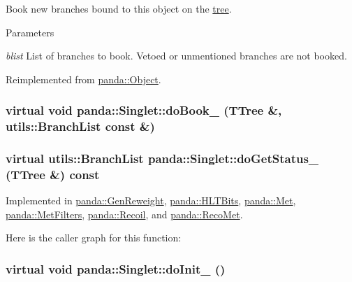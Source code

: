 Book new branches bound to this object on the \hyperlink{namespacepanda_1_1tree}{tree}. 
\begin{DoxyParams}{Parameters}
\item[{\em blist}]List of branches to book. Vetoed or unmentioned branches are not booked. \end{DoxyParams}


Reimplemented from \hyperlink{classpanda_1_1Object_a2fcd6665633deef16e86aa4e49135dd7}{panda::Object}.\hypertarget{classpanda_1_1Singlet_ab72b7d0fc56f6c5cfe4b8200c8927b1b}{
\subsubsection[{doBook\_\-}]{\setlength{\rightskip}{0pt plus 5cm}virtual void panda::Singlet::doBook\_\- (TTree \&, \/  {\bf utils::BranchList} const \&)}}
\label{classpanda_1_1Singlet_ab72b7d0fc56f6c5cfe4b8200c8927b1b}
\hypertarget{classpanda_1_1Singlet_ad2749c2f28a2970eda99db906a116881}{
\subsubsection[{doGetStatus\_\-}]{\setlength{\rightskip}{0pt plus 5cm}virtual {\bf utils::BranchList} panda::Singlet::doGetStatus\_\- (TTree \&) const}}
\label{classpanda_1_1Singlet_ad2749c2f28a2970eda99db906a116881}


Implemented in \hyperlink{classpanda_1_1GenReweight_a0d5945a3b2fd8aba14d8259a3dc36e97}{panda::GenReweight}, \hyperlink{classpanda_1_1HLTBits_a25f37a9baf25b848fb303f8d08daa027}{panda::HLTBits}, \hyperlink{classpanda_1_1Met_aa3b7a9f0bbbc48a0dbf21909c0c18d30}{panda::Met}, \hyperlink{classpanda_1_1MetFilters_ad31a44df0eb98f6402c27fe8cf95b7e3}{panda::MetFilters}, \hyperlink{classpanda_1_1Recoil_ad20acbe1a9a80eabffbab6bca8d99d24}{panda::Recoil}, and \hyperlink{classpanda_1_1RecoMet_a17e58c29268fd0e3f84467046cf28f2b}{panda::RecoMet}.

Here is the caller graph for this function:\hypertarget{classpanda_1_1Singlet_af5afe7bf7b223c51d1763953ac24d261}{
\subsubsection[{doInit\_\-}]{\setlength{\rightskip}{0pt plus 5cm}virtual void panda::Singlet::doInit\_\- ()}}
\label{classpanda_1_1Singlet_af5afe7bf7b223c51d1763953ac24d261}


